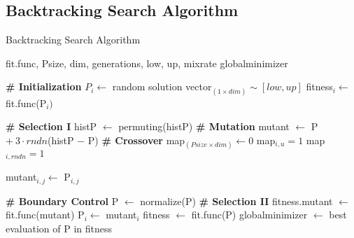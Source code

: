 \subsection{Backtracking Search Algorithm}
\begin{algorithm}
	\singlespacing
	\caption{Backtracking Search Algorithm} \label{BSA}
	\begin{algorithmic}[1]
		\INPUT fit.func, Psize, dim, generations, low, up, mixrate
		\OUTPUT globalminimizer
		
		\noindent \Statex  \hrulefill
		\Statex \textbf{\# Initialization}
		\State $P_i \gets $ random solution vector$_{(1 \times dim)} \sim [low, up] $
		\State fitness$_i \gets $ fit.func(P$_i)$ \EndFor
		\Statex
		
		\Statex \textbf{\# Selection I}
		 \EndIf
		\State histP $\gets$ permuting(histP)
		\Statex \textbf{\# Mutation}
		\State mutant $\gets$ P $ + \:3 \cdot rndn$(histP $-$ P)
		\Statex \textbf{\# Crossover}
		\State map$_{(Psize\times dim)} \gets 0$
		 				 
		\State map$_{i, u} = 1$ 		 
		\Else
		\State map$_{i, rndn} = 1$      
		\EndIf
		\EndFor
		
		\State mutant$_{i,j} \gets$ P$_{i, j}$ \EndIf 
		\EndFor 
		
		\Statex \textbf{\# Boundary Control}
		\State P $\gets$ normalize(P) 
		\Statex \textbf{\# Selection II}
		\State fitness.mutant $\gets$ fit.func(mutant)
		\State P$_i \gets$ mutant$_i$
		\EndIf
		\EndFor
		\State fitness $\gets$ fit.func(P)
		\State globalminimizer $\gets$ best evaluation of P in fitness
		
		\EndFor	
		
	\end{algorithmic}
\end{algorithm}

\newpage
